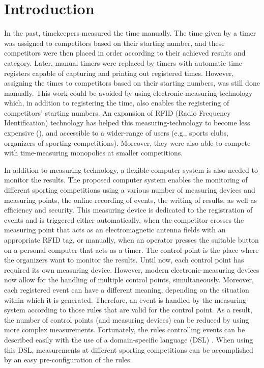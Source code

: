 \documentclass[preprint, prX]{revtex4}
\begin{document}
\section{Introduction}
In the past, timekeepers measured the time manually. The time given by a timer was assigned to competitors based on their starting number, and these competitors were then placed in order according to their achieved results and category. Later, manual timers were replaced by timers with automatic time-registers capable of capturing and printing out registered times. However, assigning the times to competitors based on their starting numbers, was still done manually. This work could be avoided by using electronic-measuring technology which, in addition to registering the time, also enables the registering of competitors' starting numbers. An expansion of RFID (Radio Frequency Identification) technology has helped this measuring-technology to become less expensive (\cite{web:ChampionChip2010,web:RFID2010}), and accessible to a wider-range of users (e.g., sports clubs, organizers of sporting competitions). Moreover, they were also able to compete with time-measuring monopolies at smaller competitions.

In addition to measuring technology, a flexible computer system is also needed to monitor the results. The proposed computer system enables the monitoring of different sporting competitions using a various number of measuring devices and measuring points, the online recording of events, the writing of results, as well as efficiency and security. This measuring device is dedicated to the registration of events and is triggered either automatically, when the competitor crosses the measuring point that acts as an electromagnetic antenna fields with an appropriate RFID tag, or manually, when an operator presses the suitable button on a personal computer that acts as a timer. The control point is the place where the organizers want to monitor the results. Until now, each control point has required its own measuring device. However, modern electronic-measuring devices now allow for the handling of multiple control points, simultaneously. Moreover, each registered event can have a different meaning, depending on the situation within which it is generated. Therefore, an event is handled by the measuring system according to those rules that are valid for the control point. As a result, the number of control points (and measuring devices) can be reduced by using more complex measurements. Fortunately, the rules controlling events can be described easily with the use of a domain-specific language (DSL) \cite{Hudak:1996,Mernik:2005}. When using this DSL, measurements at different sporting competitions can be accomplished by an easy pre-configuration of the rules.
\end{document}

